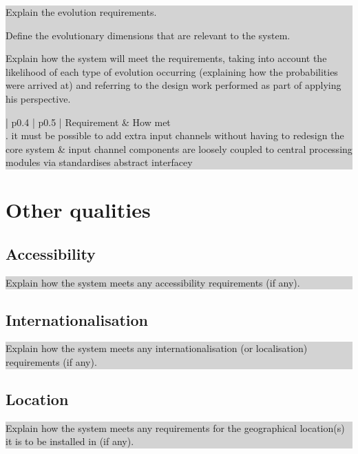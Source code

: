 \documentclass[a4paper,11pt]{report}
\newcommand{\instructions}[1]{
  \noindent\colorbox{lightgray}{%
    \parbox{\linewidth}{%
      #1
    }%
  }%
 \vspace{0.1cm}
}
\begin{document}
\instructions{
Explain the evolution requirements.

Define the evolutionary dimensions that are relevant to the system.

Explain  how the system will meet the requirements, taking into
account the likelihood of each type of evolution occurring (explaining
how the probabilities were arrived at) and referring to the design
work performed as part of applying his perspective.

\begin{center}
  \begin{tabular}[h!]{| p{0.4\textwidth} | p{0.5\textwidth} |}
    \hline
    \rowcolor{gray}
    Requirement & How met \\
    \hline
    \hline
    1. it must be possible to add extra input channels without having
    to redesign the core system & input channel components are loosely
    coupled to central processing modules via standardises abstract
    interfacey\\

    \hline
 \end{tabular}
\end{center}
}

\section{Other qualities}
\label{sec:other-qualities}

\subsection{Accessibility}
\label{sec:accessibility}

\instructions{
Explain how the system meets any accessibility requirements (if any).
}

\subsection{Internationalisation}
\label{sec:internationalisation}

\instructions{
Explain how the system meets any internationalisation (or
localisation) requirements (if any).
}

\subsection{Location}
\label{sec:location}

\instructions{
Explain how the system meets any requirements for the geographical
location(s) it is to be installed in (if any).
}
\end{document}

